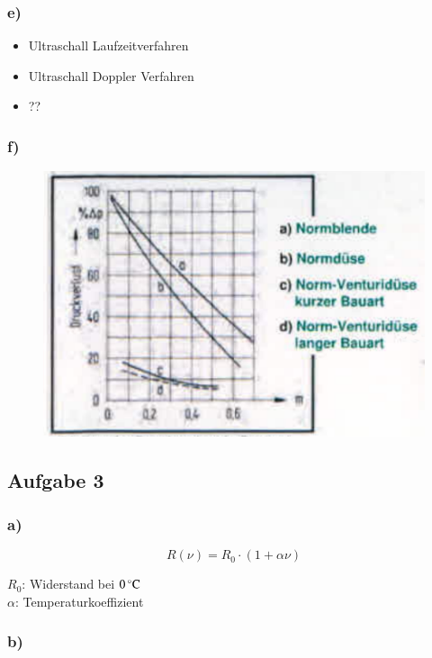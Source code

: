 \subsubsection*{e)}

\begin{itemize}
\item Ultraschall Laufzeitverfahren
\item Ultraschall Doppler Verfahren
\item ??
\end{itemize}


\subsubsection*{f)}

\begin{figure}[h]
\centering
\includegraphics[scale=0.5]{A2f.png}
\end{figure}


\subsection{Aufgabe 3}

\subsubsection*{a)}

\[ R(\nu) = R_0 \cdot \left( 1 + \alpha \nu \right) \]

$R_0$: Widerstand bei $\unit[0]{^\circ C}$ \\
$\alpha$: Temperaturkoeffizient


\subsubsection*{b)}

